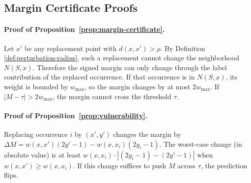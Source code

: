 \subsection{Margin Certificate Proofs}

\paragraph{Proof of Proposition~\ref{prop:margin-certificate}.}
Let $x'$ be any replacement point with $d(x, x') > \rho$. By Definition
\ref{def:perturbation-radius}, such a replacement cannot change the
neighborhood $N(S,x)$. Therefore the signed margin can only change through
the label contribution of the replaced occurrence. If that occurrence is in
$N(S,x)$, its weight is bounded by $w_{\max}$, so the margin changes by at
most $2 w_{\max}$. If $|M - \tau| > 2 w_{\max}$, the margin cannot cross the
threshold $\tau$.

\paragraph{Proof of Proposition~\ref{prop:vulnerability}.}
Replacing occurrence $i$ by $(x',y')$ changes the margin by
$\Delta M = w(x,x')(2y'-1) - w(x,x_i)(2y_i-1)$. The worst-case change (in
absolute value) is at least $w(x,x_i) \cdot |(2y_i-1) - (2y'-1)|$ when
$w(x,x') \ge w(x,x_i)$. If this change suffices to push $M$ across $\tau$,
the prediction flips.
